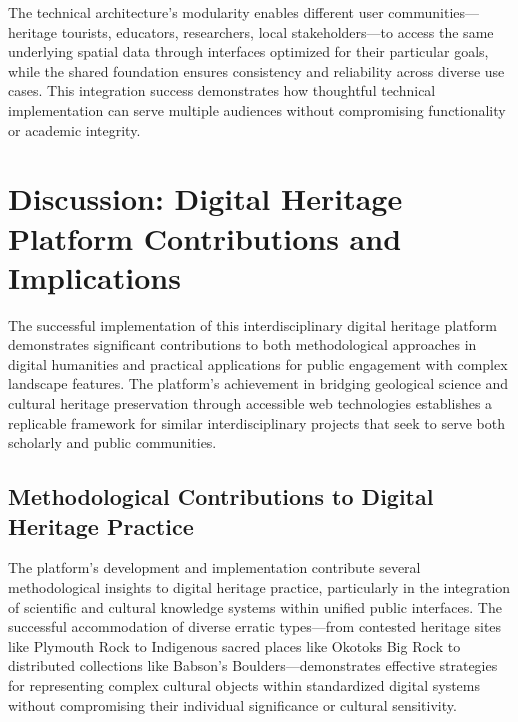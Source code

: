 The technical architecture's modularity enables different user communities—heritage tourists, educators, researchers, local stakeholders—to access the same underlying spatial data through interfaces optimized for their particular goals, while the shared foundation ensures consistency and reliability across diverse use cases. This integration success demonstrates how thoughtful technical implementation can serve multiple audiences without compromising functionality or academic integrity.


\section{Discussion: Digital Heritage Platform Contributions and Implications}
\label{sec:discussion_implications}

The successful implementation of this interdisciplinary digital heritage platform demonstrates significant contributions to both methodological approaches in digital humanities and practical applications for public engagement with complex landscape features. The platform's achievement in bridging geological science and cultural heritage preservation through accessible web technologies establishes a replicable framework for similar interdisciplinary projects that seek to serve both scholarly and public communities.

\subsection{Methodological Contributions to Digital Heritage Practice}
\label{subsec:methodological_contributions}

The platform's development and implementation contribute several methodological insights to digital heritage practice, particularly in the integration of scientific and cultural knowledge systems within unified public interfaces. The successful accommodation of diverse erratic types—from contested heritage sites like Plymouth Rock to Indigenous sacred places like Okotoks Big Rock to distributed collections like Babson's Boulders—demonstrates effective strategies for representing complex cultural objects within standardized digital systems without compromising their individual significance or cultural sensitivity.

